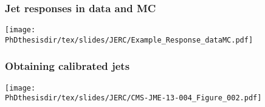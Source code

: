 \begin{frame}
\frametitle{Jet responses in data and MC}
\begin{center}
\texttt{[image: \\PhDthesisdir/tex/slides/JERC/Example\_Response\_dataMC.pdf]}
\end{center}
\end{frame}

\begin{frame}
\frametitle{Obtaining calibrated jets}
\begin{center}
\texttt{[image: \\PhDthesisdir/tex/slides/JERC/CMS-JME-13-004\_Figure\_002.pdf]}
\end{center}
\end{frame}